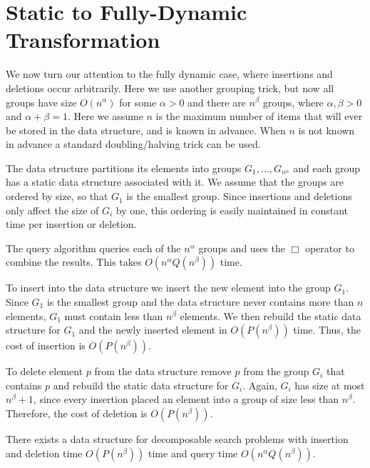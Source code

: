 \section{Static to Fully-Dynamic Transformation}

We now turn our attention to the fully dynamic case, where insertions
and deletions occur arbitrarily.  Here we use another grouping trick,
but now all groups have size $O(n^\alpha)$ for some $\alpha>0$ and
there are $n^\beta$ groups, where $\alpha,\beta>0$ and
$\alpha+\beta=1$.  Here we assume $n$ is the maximum number of items
that will ever be stored in the data structure, and is known in
advance.  When $n$ is not known in advance a standard doubling/halving
trick can be used.

The data structure partitions its elements into groups
$G_1,\ldots,G_{n^{\alpha}}$ and each group has a static data structure
associated with it.  We assume that the groups are ordered by size, 
so that $G_1$ is the smallest group.  Since insertions and deletions
only affect the size of $G_i$ by one, this ordering is easily maintained
in constant time per insertion or deletion.

The query algorithm queries each of the $n^\alpha$ groups and uses the
$\Box$ operator to combine the results.  This takes $O(n^\alpha
Q(n^{\beta}))$ time.

To insert into the data structure we insert the new element into the
group $G_1$.  Since $G_1$ is the smallest group and the data structure
never contains more than $n$ elements, $G_1$ must contain less than
$n^{\beta}$ elements.  We then rebuild the static data structure for
$G_1$ and the newly inserted element in $O(P(n^{\beta}))$ time.  Thus,
the cost of insertion is $O(P(n^{\beta}))$.

To delete element $p$ from the data structure remove $p$ from the
group $G_i$ that contains $p$ and rebuild the static data structure
for $G_i$.  Again, $G_i$ has size at most $n^{\beta}+1$, since every
insertion placed an element into a group of size less than $n^{\beta}$.
Therefore, the cost of deletion is $O(P(n^{\beta}))$.

\begin{thm}
There exists a data structure for decomposable search problems with
insertion and deletion time $O(P(n^\beta))$ time and query time
$O(n^\alpha Q(n^\beta))$.
\end{thm}


